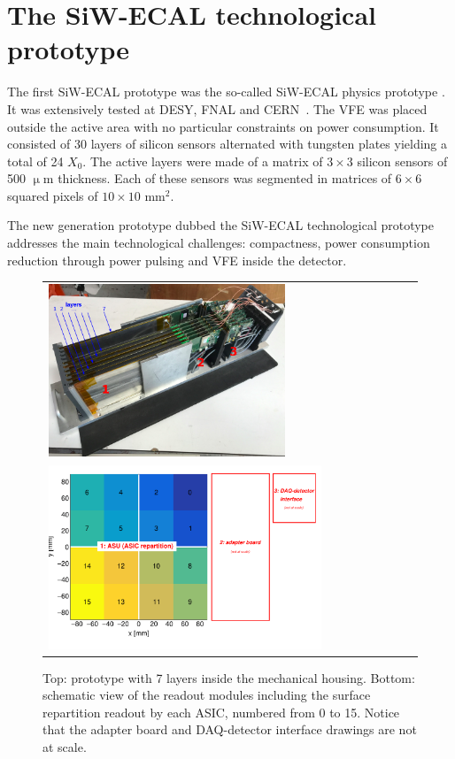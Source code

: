 \documentclass[final,3p,times,twocolumn]{elsarticle}
\begin{document}
\section{The SiW-ECAL technological prototype}

The first SiW-ECAL prototype was the so-called SiW-ECAL physics prototype \cite{Anduze:2008hq}.
It was extensively tested at DESY, FNAL and CERN~\cite{Adloff:2011ha,Adloff:2008aa,Adloff:2010xj,CALICE:2011aa,Bilki:2014uep}.
The VFE was placed outside the active area with no particular constraints on power consumption.
It consisted of 30 layers of silicon sensors alternated with tungsten plates 
yielding a total of 24 $X_{0}$.
The active layers were made of a matrix of $3\times3$ silicon sensors of 500 $\upmu$m thickness. Each of these sensors was segmented in matrices of
$6\times6$ squared pixels of $10\times10$ mm$^2$.

The new generation prototype dubbed the SiW-ECAL technological prototype addresses the main technological challenges: compactness,
power consumption reduction through power pulsing and VFE inside the detector.

\begin{figure}[!ht]
\centering
\begin{tabular}{l}
  \includegraphics[width=0.65\textwidth]{proto_numbered_2.png} \\
  \includegraphics[width=0.75\textwidth]{mapping-eps-converted-to.pdf} \\
\end{tabular}
\caption{Top: prototype with 7 layers inside the mechanical housing. Bottom: schematic view of the readout modules
  including the surface repartition readout by each ASIC, numbered from 0 to 15. Notice that the adapter board and DAQ-detector interface drawings are not at scale.}
\label{proto}
\end{figure}
\end{document}
